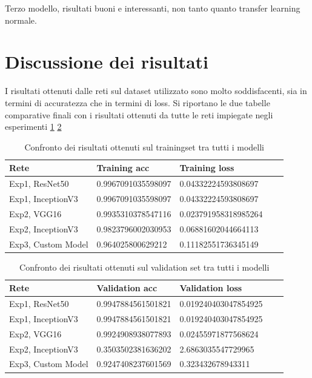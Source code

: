 Terzo modello, risultati buoni e interessanti, non tanto quanto transfer learning normale.


\section{Discussione dei risultati}

I risultati ottenuti dalle reti sul dataset utilizzato sono molto soddisfacenti, sia in termini di accuratezza che in termini di loss.
Si riportano le due tabelle comparative finali con i risultati ottenuti da tutte le reti impiegate negli esperimenti \ref{tab:confronto_risultati_training} \ref{tab:confronto_risultati_loss}

\begin{table}[H]
    \begin{tabular}{|l|l|l|l|l|}
    \hline
    \textbf{Rete}                         & \textbf{Training acc} & \textbf{Training loss}   \\ \hline
    Exp1, ResNet50     & 0.9967091035598097     & 0.04332224593808697 \\ \hline
    Exp1, InceptionV3  & 0.9967091035598097     & 0.04332224593808697  \\ \hline
    Exp2, VGG16        & 0.9935310378547116     & 0.023791958318985264  \\ \hline
    Exp2, InceptionV3  & 0.9823796002030953     & 0.06881602044664113   \\ \hline
    Exp3, Custom Model & 0.964025800629212      & 0.11182551736345149     \\ \hline
    \end{tabular}
    \caption{\label{tab:confronto_risultati_training}Confronto dei risultati ottenuti sul trainingset tra tutti i modelli}
\end{table}

\begin{table}[H]
    \begin{tabular}{|l|l|l|l|l|}
    \hline
    \textbf{Rete}                         &  \textbf{Validation acc} & \textbf{Validation loss}    \\ \hline
    Exp1, ResNet50      & 0.9947884561501821    & 0.019240403047854925 \\ \hline
    Exp1, InceptionV3  & 0.9947884561501821    & 0.019240403047854925 \\ \hline
    Exp2, VGG16        & 0.9924908938077893    & 0.02455971877568624  \\ \hline
    Exp2, InceptionV3 & 0.3503502381636202    & 2.6863035547729965   \\ \hline
    Exp3, Custom Model  & 0.9247408237601569    & 0.323432678943311    \\ \hline
    \end{tabular}
    \caption{\label{tab:confronto_risultati_loss}Confronto dei risultati ottenuti sul validation set tra tutti i modelli}
\end{table}

